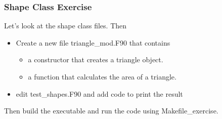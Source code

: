 \documentclass[11pt]{beamer}
\begin{document}

\begin{frame}[fragile]
\frametitle{Shape Class Exercise}

Let's look at the shape class files. Then
\begin{itemize}
\item Create a new file triangle\_mod.F90 that contains
\begin{itemize}
\item a constructor that creates a triangle object.
\item a function that calculates the area of a triangle.
 \end{itemize}
\item edit test\_shapes.F90 and add code to print the result
 \end{itemize}
Then build the executable and run the code using Makefile\_exercise.

\end{frame}
\end{document}
